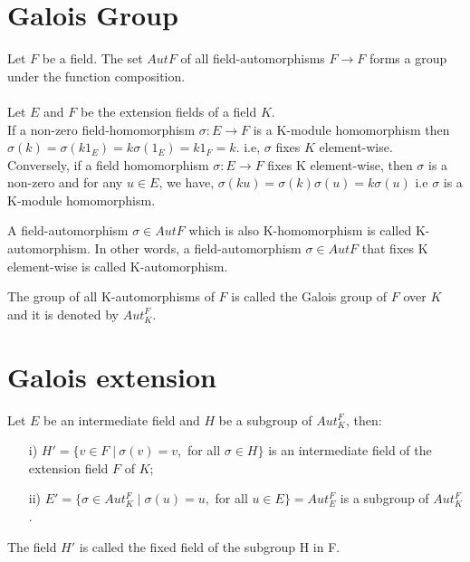 \section{Galois Group}
Let \(F\) be a field. The set \(AutF\) of all field-automorphisms \(F \rightarrow F \) forms a group under the function composition.\\ \\
Let \(E\) and \(F\) be the extension fields of a field \(K\).\\
If a non-zero field-homomorphism \(\sigma : E \rightarrow F\) is a K-module homomorphism then\\
\(\sigma(k)=\sigma(k1_E)=k\sigma(1_E)=k1_F=k\).\hspace{7mm}
i.e, \(\sigma\) fixes \(K\) element-wise.\\
Conversely, if a field homomorphism \(\sigma : E \rightarrow F\) fixes K element-wise, then \(\sigma\) is a non-zero and for any \(u \in E\), we have, \(\sigma(ku)=\sigma(k)\sigma(u)=k\sigma(u)\)
i.e \(\sigma\) is a K-module homomorphism.
\begin{definition}
  A field-automorphism \(\sigma \in Aut F\) which is also K-homomorphism is called K-automorphism. In other words, a field-automorphism \(\sigma \in Aut F\) that fixes K element-wise is called K-automorphism.
\end{definition}

\begin{definition}
  The group of all K-automorphisms of \(F\) is called the Galois group of \(F\) over \(K\) and it is denoted by \(Aut_K^F\).
\end{definition}

\section{Galois extension}
Let \(E\) be an intermediate field and \(H\) be a subgroup of \(Aut_K^F\), then:
\begin{enumerate}
\item[i)] \(H' = \{v \in F \; | \: \sigma(v)=v,\) for all \(\sigma \in H \}\) is an intermediate field of the extension field \(F\) of \(K\);
\item[ii)] \(E' = \{\sigma \in Aut_K^F \; | \; \sigma(u)=u,\) for all \(u \in E\}=Aut_E^F\) is a subgroup of \(Aut_K^F\).
\end{enumerate}

The field \(H'\) is called the fixed field of the subgroup H in F.

